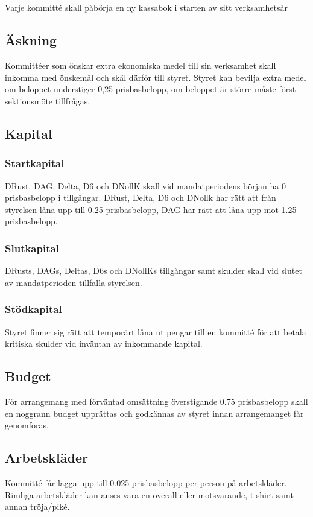 \documentclass[a4paper, 10pt]{article}
\begin{document}
\subsection{}
Varje kommitté skall påbörja en ny kassabok i starten av sitt verksamhetsår
\subsection{Äskning}
Kommittéer som önskar extra ekonomiska medel till sin verksamhet skall inkomma med önskemål och skäl därför till styret. Styret kan bevilja extra medel om beloppet understiger 0,25 prisbasbelopp, om beloppet är större måste först sektionsmöte tillfrågas.
\subsection{Kapital}
\label{sec:sektionsforeningar_startkapital}
\subsubsection{Startkapital}
DRust, DAG, Delta, D6 och DNollK skall vid mandatperiodens början ha 0 prisbasbelopp
i tillgångar. DRust, Delta, D6 och DNollk har rätt att från styrelsen låna
upp till 0.25 prisbasbelopp, DAG har rätt att låna upp mot 1.25 prisbasbelopp.
\subsubsection{Slutkapital}
DRusts, DAGs, Deltas, D6s och DNollKs tillgångar samt skulder skall vid slutet av mandatperioden tillfalla styrelsen.
\subsubsection{Stödkapital}
Styret finner sig rätt att temporärt låna ut
pengar till en kommitté för att betala kritiska skulder vid inväntan av inkommande
kapital.
\subsection{Budget}
För arrangemang med förväntad omsättning överstigande 0.75 prisbasbelopp skall en noggrann budget upprättas och godkännas av styret innan arrangemanget får genomföras.
\subsection{Arbetskläder}
Kommitté får lägga upp till 0.025 prisbasbelopp per person på arbetskläder. Rimliga arbetskläder kan anses vara en overall eller motsvarande, t-shirt samt annan
tröja/piké.
\end{document}
